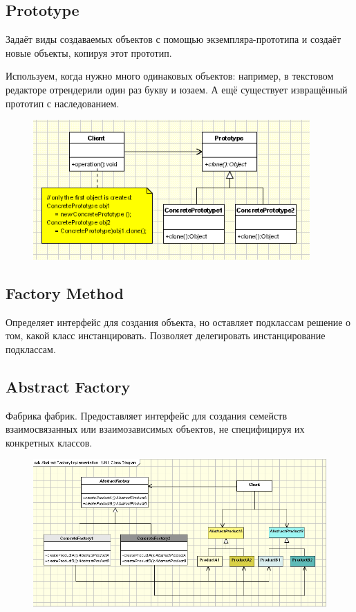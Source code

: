 \documentclass[11pt,a4paper]{article}
\begin{document}
\subsection{Prototype}
Задаёт виды создаваемых объектов с помощью экземпляра-прототипа и создаёт новые объекты, копируя этот прототип.

Используем, когда нужно много одинаковых объектов: например, в текстовом редакторе отрендерили один раз букву и юзаем. А ещё существует извращённый прототип с наследованием.

\begin{figure}[H]
	\centering
	\includegraphics[width=300pt]{pics/prototype-pattern.png}
\end{figure}

\subsection{Factory Method}
Определяет интерфейс для создания объекта, но оставляет подклассам решение о том, какой класс инстанцировать. Позволяет делегировать инстанцирование подклассам.

\subsection{Abstract Factory}
Фабрика фабрик. Предоставляет интерфейс для создания семейств взаимосвязанных или взаимозависимых объектов, не специфицируя их конкретных классов.

\begin{figure}[H]
	\centering
	\includegraphics[width=450pt]{pics/abstract-factory-pattern.png}
\end{figure}
\end{document}

